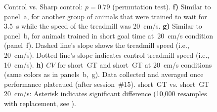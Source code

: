 \begin{figure}[!bt]
\begin{center}
{    Control vs. Sharp control: $p=0.79$ (permutation test).
    \textbf{f)}
    Similar to panel~a, for another group of animals that were trained to wait for 3.5~s while the speed of the treadmill was 20~cm/s.
    \textbf{g)}
    Similar to panel~b, for animals trained in short goal time at~20~cm/s condition (panel~f).
    Dashed line's slope shows the treadmill speed (i.e., 20~cm/s).
    Dotted line's slope indicates control treadmill speed (i.e., 10~cm/s).
    \textbf{h)}
    $CV$ for short~GT and short~GT at 20~cm/s conditions (same colors as in panels~b,~g).
    Data collected and averaged once performance plateaued (after session~\#15).
    short~GT vs. short~GT 20~cm/s: Asterisk indicates significant difference (10,000 resamples with replacement, see ).
    }
    \label{fig:time:shortSharp}
  \end{center}
\end{figure}